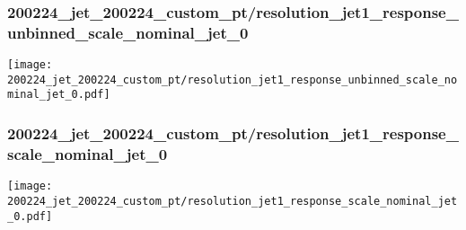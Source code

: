 \begin{frame}
   \frametitle{\small 200224\_jet\_200224\_custom\_pt/resolution\_jet1\_response\_unbinned\_scale\_nominal\_jet\_0}
   \centering
   \texttt{[image: 200224\_jet\_200224\_custom\_pt/resolution\_jet1\_response\_unbinned\_scale\_nominal\_jet\_0.pdf]}
\end{frame}

\begin{frame}
   \frametitle{\small 200224\_jet\_200224\_custom\_pt/resolution\_jet1\_response\_scale\_nominal\_jet\_0}
   \centering
   \texttt{[image: 200224\_jet\_200224\_custom\_pt/resolution\_jet1\_response\_scale\_nominal\_jet\_0.pdf]}
\end{frame}

